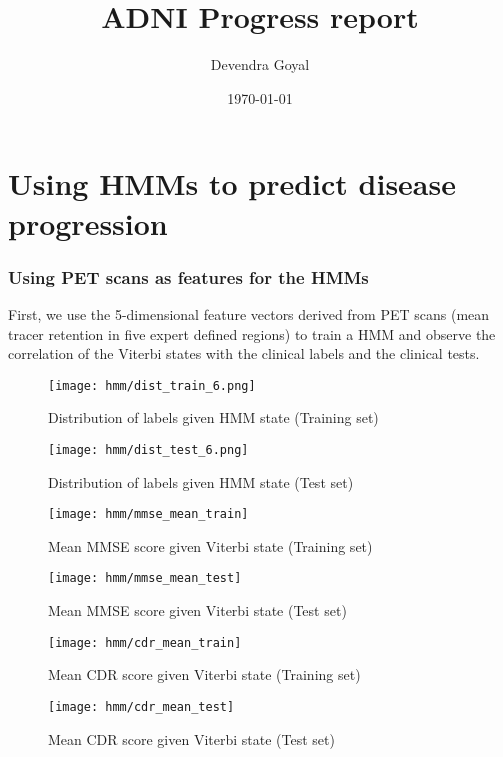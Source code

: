 \documentclass[12pt,a4paper]{article}
\title{ADNI Progress report}
\author{Devendra Goyal}
\date{\today}
\begin{document}
\maketitle

\part{Using HMMs to predict disease progression}

\section{Using PET scans as features for the HMMs}
\label{sec:pet-hmm}

First, we use the 5-dimensional feature vectors derived from PET scans
(mean tracer retention in five expert defined regions) to train a HMM
and observe the correlation of the Viterbi states with the clinical
labels and the clinical tests.

\begin{figure}[H]
  \centering
  \texttt{[image: hmm/dist\_train\_6.png]}
  \caption{Distribution of labels given HMM state (Training set)}  
\end{figure}

\begin{figure}[H]
  \centering
  \texttt{[image: hmm/dist\_test\_6.png]}
  \caption{Distribution of labels given HMM state (Test set)}  
\end{figure}

\begin{figure}[H]
  \centering
  \texttt{[image: hmm/mmse\_mean\_train]}
  \caption{Mean MMSE score given Viterbi state (Training set)}  
\end{figure}

\begin{figure}[H]
  \centering
  \texttt{[image: hmm/mmse\_mean\_test]}
  \caption{Mean MMSE score given Viterbi state (Test set)}  
\end{figure}

\begin{figure}[H]
  \centering
  \texttt{[image: hmm/cdr\_mean\_train]}
  \caption{Mean CDR score given Viterbi state (Training set)}  
\end{figure}

\begin{figure}[H]
  \centering
  \texttt{[image: hmm/cdr\_mean\_test]}
  \caption{Mean CDR score given Viterbi state (Test set)}  
\end{figure}
\end{document}
